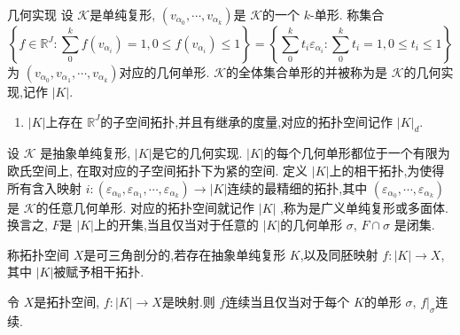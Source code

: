 \documentclass[../../几何与拓扑.tex]{subfiles}
\begin{document}
\begin{definition}{几何实现}
    设 \(  \mathcal{K}  \)是单纯复形, \(  \left( v_{\alpha _0 },\cdots ,v_{\alpha _k } \right)   \)是 \(  \mathcal{K}  \)的一个 \(  k  \)-单形.
    称集合 \[
    \left\{ f \in \mathbb{R} ^{J}: \sum _{0}^{k} f\left( v_{\alpha _i } \right)= 1, 0\le f\left( v_{\alpha _i } \right)\le 1   \right\} =  \left\{ \sum _{0}^{k} t_{i} \varepsilon _{\alpha _i } : \sum _{0}^{k}t_{i}= 1, 0\le t_{i}\le 1\right\}
    \]为 \(  \left( v_{\alpha _0 },v_{\alpha _1 },\cdots ,v_{\alpha _k } \right)   \)对应的几何单形.  \(  \mathcal{K}  \)的全体集合单形的并被称为是 \(  \mathcal{K}  \)的几何实现,记作 \(  \left| K \right|   \).   
\end{definition}

\begin{enumerate}
    \item  \(  \left| K \right|   \)上存在 \(  \mathbb{R} ^{J}  \)的子空间拓扑,并且有继承的度量,对应的拓扑空间记作 \(  \left| K \right|_{d}   \). 
\end{enumerate}

\begin{definition}
    设 \( \mathcal{K}  \) 是抽象单纯复形, \(  \left| K \right|   \)是它的几何实现.
     \(  \left| K \right|   \)的每个几何单形都位于一个有限为欧氏空间上, 在取对应的子空间拓扑下为紧的空间.
    定义 \(  \left| K \right|   \)上的相干拓扑,为使得所有含入映射 \(  i:\left( \varepsilon _{\alpha _0 },\varepsilon _{\alpha _1 },\cdots ,\varepsilon _{\alpha _k } \right)\to \left| K \right|    \)连续的最精细的拓扑,其中 \(  \left( \varepsilon _{\alpha _0 },\cdots ,\varepsilon _{\alpha _k } \right)   \)是 \(  \mathcal{K}  \)的任意几何单形.
    对应的拓扑空间就记作 \(  \left| K \right|   \) ,称为是广义单纯复形或多面体.换言之, \(  F  \)是 \(  \left| K \right|   \)上的开集,当且仅当对于任意的 \(  \left| K \right|   \)的几何单形 \(   \sigma   \), \(  F\cap  \sigma   \)     是闭集.
\end{definition}

\begin{definition}
    称拓扑空间 \(  X  \)是可三角剖分的,若存在抽象单纯复形 \(  K  \),以及同胚映射 \(  f: \left| K \right|\to X   \),其中 \(  \left| K \right|   \)被赋予相干拓扑.    
\end{definition}


\begin{theorem}
    令 \(  X  \)是拓扑空间, \(  f: \left| K \right|\to X   \)是映射.则 \(  f  \)连续当且仅当对于每个 \(  K  \)的单形 \(   \sigma   \), \(  f|_{ \sigma }  \)连续.      
\end{theorem}
\end{document}
